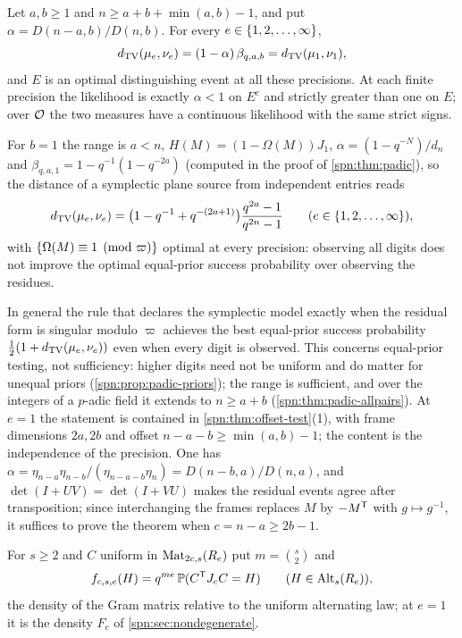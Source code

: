 \begin{theorem}\label{spn:thm:padic-pairs}
Let $a,b\ge1$ and $n\ge a+b+\min(a,b)-1$, and put $\alpha=D(n-a,b)/D(n,b)$. For every
$e\in\{1,2,\dots,\infty\}$,
\[
 d_{\mathrm{TV}}(\mu_e,\nu_e)=(1-\alpha)\,\beta_{q,a,b}=d_{\mathrm{TV}}(\mu_1,\nu_1),
\]
and $E$ is an optimal distinguishing event at all these precisions. At each finite precision the
likelihood is exactly $\alpha<1$ on $E^c$ and strictly greater than one on $E$; over $\mathcal{O}$ the two
measures have a continuous likelihood with the same strict signs.
\end{theorem}

For $b=1$ the range is $a<n$, $H(M)=(1-\Omega(M))J_1$, $\alpha=(1-q^{-N})/d_n$ and
$\beta_{q,a,1}=1-q^{-1}(1-q^{-2a})$ (computed in the proof of \cref{spn:thm:padic}), so the
distance of a symplectic plane source from independent entries reads
\[
 d_{\mathrm{TV}}(\mu_e,\nu_e)=\bigl(1-q^{-1}+q^{-(2a+1)}\bigr)\frac{q^{2a}-1}{q^{2n}-1}
 \qquad(e\in\{1,2,\dots,\infty\}),
\]
with $\{\Omega(M)\equiv1\pmod\varpi\}$ optimal at every precision: observing all digits does not
improve the optimal equal-prior success probability over observing the residues.

In general the rule that declares the symplectic model exactly when the residual form is singular modulo
$\varpi$ achieves the best equal-prior success probability $\frac12(1+d_{\mathrm{TV}}(\mu_e,\nu_e))$ even when
every digit is observed. This concerns equal-prior testing, not sufficiency: higher digits need not be
uniform and do matter for unequal priors (\cref{spn:prop:padic-priors}); the range is sufficient, and
over the integers of a $p$-adic field it extends to $n\ge a+b$ (\cref{spn:thm:padic-allpairs}). At $e=1$ the statement is contained in \cref{spn:thm:offset-test}(1), with frame dimensions
$2a,2b$ and offset $n-a-b\ge\min(a,b)-1$; the content is the independence of the precision. One
has $\alpha=\eta_{n-a}\eta_{n-b}/(\eta_{n-a-b}\eta_n)=D(n-b,a)/D(n,a)$, and
$\det(I+UV)=\det(I+VU)$ makes the residual events agree after transposition; since interchanging the
frames replaces $M$ by $-M^{\mathsf{T}}$ with $g\mapsto g^{-1}$, it suffices to prove the theorem when
$c=n-a\ge2b-1$.

For $s\ge2$ and $C$ uniform in $\operatorname{Mat}_{2c,s}(R_e)$ put $m=\binom s2$ and
\[
 f_{c,s,e}(H)=q^{me}\,\mathbb{P}(C^{\mathsf{T}}J_cC=H)\qquad(H\in\operatorname{Alt}_s(R_e)),
\]
the density of the Gram matrix relative to the uniform alternating law; at $e=1$ it is the density
$F_c$ of \cref{spn:sec:nondegenerate}.

